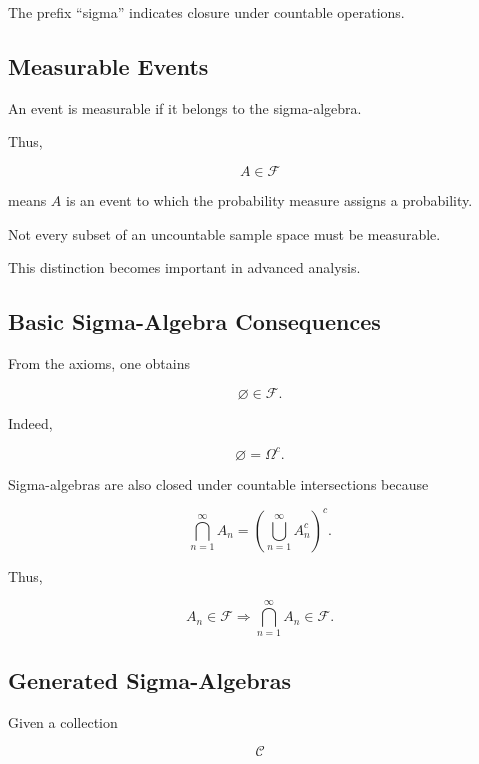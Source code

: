 The prefix ``sigma'' indicates closure under countable operations.

\subsection{Measurable Events}
\label{subsec:measurable-events}

An event is measurable if it belongs to the sigma-algebra.

Thus,

\[
\boxed{
A\in\mathcal{F}
}
\]

means \(A\) is an event to which the probability measure assigns a
probability.

Not every subset of an uncountable sample space must be measurable.

This distinction becomes important in advanced analysis.

\subsection{Basic Sigma-Algebra Consequences}
\label{subsec:sigma-algebra-consequences}

From the axioms, one obtains

\[
\varnothing\in\mathcal{F}.
\]

Indeed,

\[
\varnothing
=
\Omega^c.
\]

Sigma-algebras are also closed under countable intersections because

\[
\bigcap_{n=1}^{\infty}A_n
=
\left(
\bigcup_{n=1}^{\infty}A_n^c
\right)^c.
\]

Thus,

\[
\boxed{
A_n\in\mathcal{F}
\Longrightarrow
\bigcap_{n=1}^{\infty}A_n\in\mathcal{F}.
}
\]

\subsection{Generated Sigma-Algebras}
\label{subsec:generated-sigma-algebras}

Given a collection

\[
\mathcal{C}
\]

